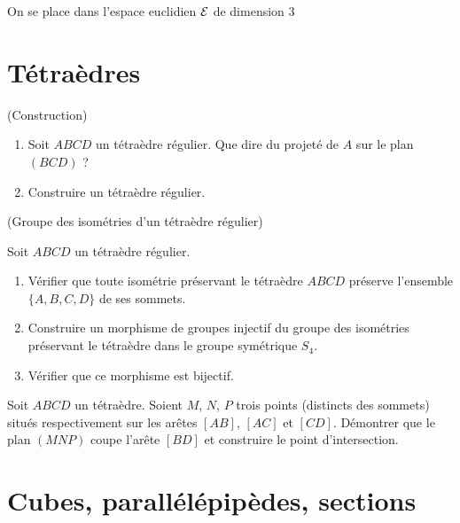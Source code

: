 \documentclass[a4paper,11pt,reqno]{amsart}
\begin{document}

\begin{convention}
  On se place dans l'espace euclidien $\mathcal{E}$ de dimension $3$
\end{convention}


\section{Tétraèdres}

\begin{exo}[0.7] (Construction)
  \begin{enumerate}
    \item Soit $ABCD$ un tétraèdre régulier. Que dire du projeté de $A$ sur le plan $(BCD)$ ?
    \item Construire un tétraèdre régulier.
  \end{enumerate}
\end{exo}

\begin{exo} (Groupe des isométries d'un tétraèdre régulier)

 Soit $ABCD$ un tétraèdre régulier.
  \begin{enumerate}
    \item Vérifier que toute isométrie préservant le tétraèdre $ABCD$ préserve l'ensemble $\{A,B,C,D\}$ de ses sommets.
    \item Construire un morphisme de groupes injectif du groupe des isométries préservant le tétraèdre dans le groupe symétrique $S_4$.
    \item Vérifier que ce morphisme est bijectif.
  \end{enumerate}
\end{exo}


\begin{exo}[.7]

  Soit $ABCD$ un tétraèdre. Soient $M$, $N$, $P$ trois points (distincts des sommets) situés respectivement sur les arêtes $[AB]$, $[AC]$ et $[CD]$. Démontrer que le plan $(MNP)$ coupe l'arête $[BD]$ et construire le point d'intersection.
\end{exo}


\section{Cubes, parallélépipèdes, sections}
\end{document}

